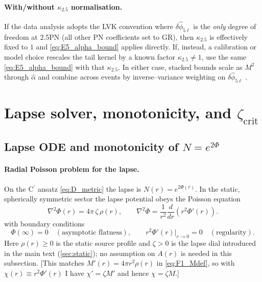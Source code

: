 \documentclass{iopjournal}
\begin{document}
\paragraph{With/without $\kappa_{2.5}$ normalisation.}
If the data analysis adopts the LVK convention where \(\delta\hat\phi_{5\ell}\) is the \emph{only} degree of freedom at 2.5PN (all other PN coefficients set to GR), then \(\kappa_{2.5}\) is effectively fixed to $1$ and \eqref{eq:E5_alpha_bound} applies directly. If, instead, a calibration or model choice rescales the tail kernel by a known factor \(\kappa_{2.5}\neq1\), use the same \eqref{eq:E5_alpha_bound} with that \(\kappa_{2.5}\). In either case, stacked bounds scale as $M^{2}$ through \(\widehat\alpha\) and combine across events by inverse–variance weighting on \(\delta\hat\phi_{5\ell}\) \cite{CutlerFlanagan1994,SathyaprakashSchutz2009,Blanchet2014LRR}.

\section{\texorpdfstring{Lapse solver, monotonicity, and $\zeta_{\mathrm{crit}}$}{Lapse solver, monotonicity, and zeta crit}}\label{app:F}

\subsection{\texorpdfstring{Lapse ODE and monotonicity of $N=e^{2\Phi}$}{Lapse ODE and monotonicity of N = exp(2 Phi)}}\label{app:F1}
\paragraph{Radial Poisson problem for the lapse.}
On the C$^\prime$ ansatz \eqref{eq:D_metric} the lapse is $N(r)=e^{2\Phi(r)}$. In the static, spherically symmetric sector the lapse potential obeys the Poisson equation
\begin{equation}
\nabla^{2}\Phi(r)=4\pi\,\zeta\,\rho(r),\qquad
\nabla^{2}\Phi=\frac{1}{r^{2}}\frac{d}{dr}\!\left(r^{2}\Phi'(r)\right).
\label{eq:F1_Poisson}
\end{equation}
with boundary conditions
\begin{equation}
\Phi(\infty)=0\quad(\text{asymptotic flatness}),\qquad
r^{2}\Phi'(r)\Big|_{r\to0}=0\quad(\text{regularity}).
\label{eq:F1_BCs}
\end{equation}
Here $\rho(r)\ge0$ is the static source profile and $\zeta>0$ is the lapse dial introduced in the main text (\cref{sec:static}); no assumption on $A(r)$ is needed in this subsection. [This matches $M'(r)=4\pi r^{2}\rho(r)$ in \eqref{eq:F1_Mdef}, so with $\chi(r)\equiv r^{2}\Phi'(r)$ I have $\chi'=\zeta M'$ and hence $\chi=\zeta M$.]
\end{document}
